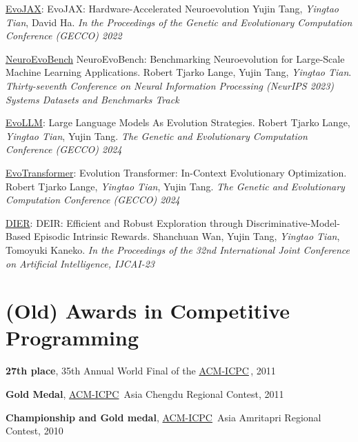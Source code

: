 \documentclass[line,margin]{cv}
\newcommand{\myemph}{\textbf}
\newcommand{\ICPC}{\href{http://https://icpc.global//}{ACM-ICPC}}
\begin{document}
\begin{resume}
  \underline{EvoJAX}: {EvoJAX: Hardware-Accelerated Neuroevolution}
  Yujin Tang, \emph{Yingtao Tian}, David Ha.   \emph{In the Proceedings of the Genetic and Evolutionary Computation Conference (GECCO) 2022}

  \underline{NeuroEvoBench} {NeuroEvoBench: Benchmarking Neuroevolution for Large-Scale Machine Learning Applications}.
  Robert Tjarko Lange, Yujin Tang, \emph{Yingtao Tian}. \emph{Thirty-seventh Conference on Neural Information Processing (NeurIPS 2023) Systems Datasets and Benchmarks Track}

  \underline{EvoLLM}: {Large Language Models As Evolution Strategies}.
  Robert Tjarko Lange, \emph{Yingtao Tian}, Yujin Tang. \emph{The Genetic and Evolutionary Computation Conference (GECCO) 2024}

  \underline{EvoTransformer}: {Evolution Transformer: In-Context Evolutionary Optimization}.
  Robert Tjarko Lange, \emph{Yingtao Tian}, Yujin Tang. \emph{The Genetic and Evolutionary Computation Conference (GECCO) 2024}

  \underline{DIER}: {DEIR: Efficient and Robust Exploration through Discriminative-Model-Based Episodic Intrinsic Rewards}.
  Shanchuan Wan, Yujin Tang, \emph{Yingtao Tian}, Tomoyuki Kaneko. \emph{In the Proceedings of the 32nd International Joint Conference on Artificial Intelligence, IJCAI-23}



\section{(Old) Awards in Competitive Programming}
  \myemph{27th place}, 35th Annual World Final of the \ICPC \,, 2011

  \myemph{Gold Medal}, \ICPC\ Asia Chengdu Regional Contest, 2011

  \myemph{Championship and Gold medal}, \ICPC\ Asia Amritapri Regional Contest, 2010

\end{resume}
\end{document}
